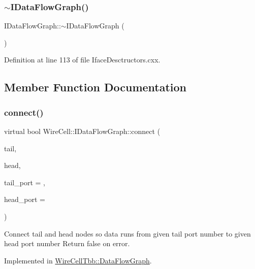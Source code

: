 \subsubsection{\texorpdfstring{$\sim$\+I\+Data\+Flow\+Graph()}{~IDataFlowGraph()}}
{\footnotesize\ttfamily I\+Data\+Flow\+Graph\+::$\sim$\+I\+Data\+Flow\+Graph (\begin{DoxyParamCaption}{ }\end{DoxyParamCaption})\hspace{0.3cm}{\ttfamily [virtual]}}



Definition at line 113 of file Iface\+Desctructors.\+cxx.



\subsection{Member Function Documentation}
\mbox{\label{class_wire_cell_1_1_i_data_flow_graph_a6d065b2f080d956a17e7da4356aa31d9}} 
\subsubsection{\texorpdfstring{connect()}{connect()}}
{\footnotesize\ttfamily virtual bool Wire\+Cell\+::\+I\+Data\+Flow\+Graph\+::connect (\begin{DoxyParamCaption}\item[{\hyperlink{class_wire_cell_1_1_interface_a09c548fb8266cfa39afb2e74a4615c37}{I\+Node\+::pointer}}]{tail,  }\item[{\hyperlink{class_wire_cell_1_1_interface_a09c548fb8266cfa39afb2e74a4615c37}{I\+Node\+::pointer}}]{head,  }\item[{size\+\_\+t}]{tail\+\_\+port = {},  }\item[{size\+\_\+t}]{head\+\_\+port = {} }\end{DoxyParamCaption})\hspace{0.3cm}{\ttfamily [pure virtual]}}

Connect tail and head nodes so data runs from given tail port number to given head port number Return false on error. 

Implemented in \hyperlink{class_wire_cell_tbb_1_1_data_flow_graph_a37432ebdd10107bbcc99205893c2587b}{Wire\+Cell\+Tbb\+::\+Data\+Flow\+Graph}.

